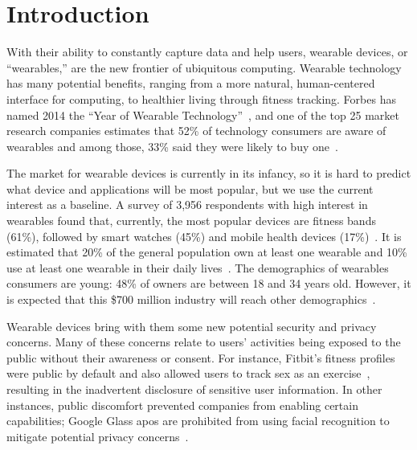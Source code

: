 \documentclass{acm_proc_article-sp}
\begin{document}



\section{Introduction}
With their ability to constantly capture data and help users, wearable devices, or ``wearables,'' are the new frontier of ubiquitous computing. Wearable technology has many potential benefits, ranging from a more natural, human-centered interface for computing, to healthier living through fitness tracking. Forbes has named 2014 the ``Year of Wearable Technology''~\cite{Forbes}, and one of the top 25 market research companies estimates that 52\% of technology consumers are aware of wearables and among those, 33\% said they were likely to buy one~\cite{NPD}. 

The market for wearable devices is currently in its infancy, so it is hard to predict what device and applications will be most popular, but we use the current interest as a baseline. A survey of 3,956 respondents with high interest in wearables found that, currently, the most popular devices are fitness bands (61\%), followed by smart watches (45\%) and mobile health devices (17\%)~\cite{Nilsen}. It is estimated that 20\% of the general population own at least one wearable and 10\% use at least one wearable in their daily lives~\cite{WearableStatNews}. The demographics of wearables consumers are young: 48\% of owners are between 18 and 34 years old. However, it is expected that this \$700 million industry will reach other demographics~\cite{cmo}. 

Wearable devices bring with them some new potential security and privacy concerns. Many of these concerns relate to users' activities being exposed to the public without their awareness or consent. For instance, Fitbit's fitness profiles were public by default and also allowed users to track sex as an exercise~\cite{Fitbit}, resulting in the inadvertent disclosure of sensitive user information. In other instances, public discomfort prevented companies from enabling certain capabilities; Google Glass apos are prohibited from using facial recognition to mitigate potential privacy concerns~\cite{GlassDetection}.
\end{document}
